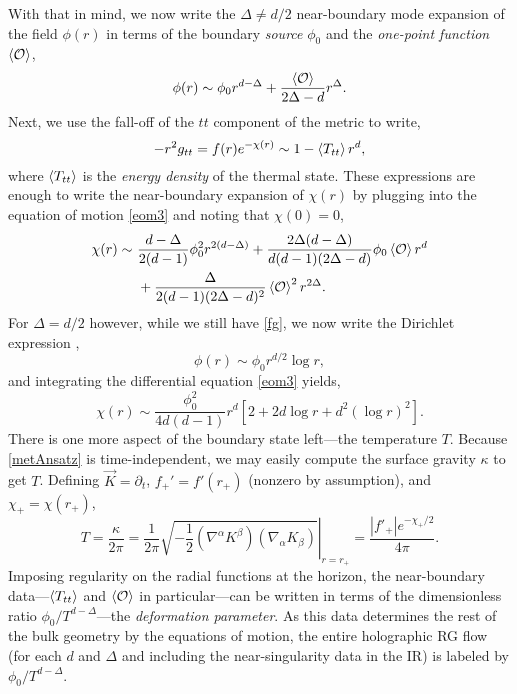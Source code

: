 \documentclass[12pt,a4paper]{article}
\begin{document}
With that in mind, we now write the $\Delta \neq d/2$ near-boundary mode expansion of the field $\phi(r)$ in terms of the boundary \textit{source} $\phi_0$ and the \textit{one-point function} $\expval{\mathcal{O}}$,
\begin{equation}
\phi(r) \sim \phi_0 r^{d-\Delta} + \frac{\expval{\mathcal{O}}}{2\Delta - d}r^{\Delta}.\label{fieldBdry}
\end{equation}
Next, we use the fall-off of the $tt$ component of the metric to write,
\begin{equation}
-r^2 g_{tt} = f(r)e^{-\chi(r)} \sim 1 - \expval{T_{tt}}r^d,\label{fg}
\end{equation}
where $\expval{T_{tt}}$ is the \textit{energy density} of the thermal state. These expressions are enough to write the near-boundary expansion of $\chi(r)$ by plugging into the equation of motion \eqref{eom3} and noting that $\chi(0) = 0$,
\begin{equation}
\begin{split}
\chi(r) \sim\ &\frac{d-\Delta}{2(d-1)}\phi_0^2 r^{2(d-\Delta)} + \frac{2\Delta(d-\Delta)}{d(d-1)(2\Delta - d)}\phi_0 \expval{\mathcal{O}} r^d\\
&+ \frac{\Delta}{2(d-1)(2\Delta-d)^2}\expval{\mathcal{O}}^2 r^{2\Delta}.
\end{split}
\end{equation}
For $\Delta = d/2$ however, while we still have \eqref{fg}, we now write the Dirichlet expression \cite{Minces:1999eg},
\begin{equation}
\phi(r) \sim \phi_0 r^{d/2}\log r,
\end{equation}
and integrating the differential equation \eqref{eom3} yields,
\begin{equation}
\chi(r) \sim \frac{\phi_0^2}{4d(d-1)} r^d \left[2 + 2d\log r + d^2 (\log r)^2\right].
\end{equation}
There is one more aspect of the boundary state left---the temperature $T$. Because \eqref{metAnsatz} is time-independent, we may easily compute the surface gravity $\kappa$ to get $T$. Defining $\vec{K} = \partial_t$, $f_+' = f'(r_+)$ (nonzero by assumption), and $\chi_+ = \chi(r_+)$,
\begin{equation}
T = \frac{\kappa}{2\pi} = \left.\frac{1}{2\pi}\sqrt{-\frac{1}{2}(\nabla^\alpha K^\beta)(\nabla_\alpha K_\beta)}\right|_{r = r_+} = \frac{|f'_+|e^{-\chi_+/2}}{4\pi}.\label{tempDef}
\end{equation}
Imposing regularity on the radial functions at the horizon, the near-boundary data---$\expval{T_{tt}}$ and $\expval{\mathcal{O}}$ in particular---can be written in terms of the dimensionless ratio $\phi_0/T^{d-\Delta}$---the \textit{deformation parameter}. As this data determines the rest of the bulk geometry by the equations of motion, the entire holographic RG flow (for each $d$ and $\Delta$ and including the near-singularity data in the IR) is labeled by $\phi_0/T^{d-\Delta}$.
\end{document}
